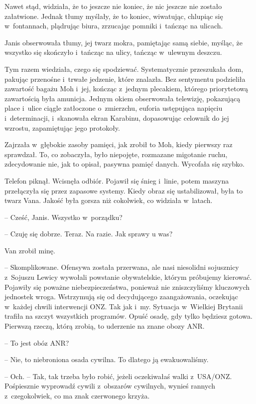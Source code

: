 \documentclass[oneside,polish,11pt,sfheadings]{mwbk}
\begin{document}
Nawet stąd, widziała, że to jeszcze nie koniec, że nic jeszcze nie
zostało załatwione. Jednak tłumy myślały, że to koniec, wiwatując,
chlupiąc się w~fontannach, plądrując biura, zrzucając pomniki i~tańcząc
na ulicach.

Janis obserwowała tłumy, jej twarz mokra, pamiętając samą siebie,
myśląc, że wszystko się skończyło i~tańcząc na ulicy, tańcząc w~ulewnym
deszczu.

Tym razem wiedziała, czego się spodziewać. Systematycznie przeszukała
dom, pakując przenośne i~trwałe jedzenie, które znalazła. Bez sentymentu
podzieliła zawartość bagażu Moh i~jej, kończąc z~jednym plecakiem,
którego priorytetową zawartością była amunicja. Jednym okiem obserwowała
telewizję, pokazującą place i~ulice ciągle zatłoczone o~zmierzchu,
euforia ustępująca napięciu i~determinacji, i~skanowała ekran Karabinu,
dopasowując celownik do jej wzrostu, zapamiętując jego protokoły.

Zajrzała w~głębokie zasoby pamięci, jak zrobił to Moh, kiedy pierwszy
raz sprawdzał. To, co zobaczyła, było niepojęte, rozmazane migotanie
ruchu, zdecydowanie nie, jak to opisał, pasywna pamięć danych. Wycofała
się szybko.

Telefon piknął. Wcisnęła odbiór. Pojawił się śnieg i~linie, potem
maszyna przełączyła się przez zapasowe systemy. Kiedy obraz się
ustabilizował, była to twarz Vana. Jakość była gorsza niż cokolwiek, co
widziała w~latach.

-- Cześć, Janis. Wszystko w~porządku?

-- Czuję się dobrze. Teraz. Na razie. Jak sprawy u was?

Van zrobił minę. 

-- Skomplikowane. Ofensywa została przerwana, ale nasi
niesolidni sojusznicy z~Sojuszu Lewicy wywołali powstanie obywatelskie,
którym próbujemy kierować. Pojawiły się poważne niebezpieczeństwa,
ponieważ nie zniszczyliśmy kluczowych jednostek wroga. Wstrzymują się od
decydującego zaangażowania, oczekując w~każdej chwili interwencji ONZ.
Tak jak i~my. Sytuacja w~Wielkiej Brytanii trafiła na szczyt wszystkich
programów. Opuść osadę, gdy tylko będziesz gotowa. Pierwszą rzeczą,
którą zrobią, to uderzenie na znane obozy ANR.

-- To jest obóz ANR?

-- Nie, to niebroniona osada cywilna. To dlatego ją ewakuowaliśmy.

-- Och. -- Tak, tak trzeba było robić, jeżeli oczekiwałaś walki z~USA/ONZ.
Pośpiesznie wyprowadź cywili z~obszarów cywilnych, wynieś rannych z~czegokolwiek, co ma znak czerwonego krzyża.
\end{document}
